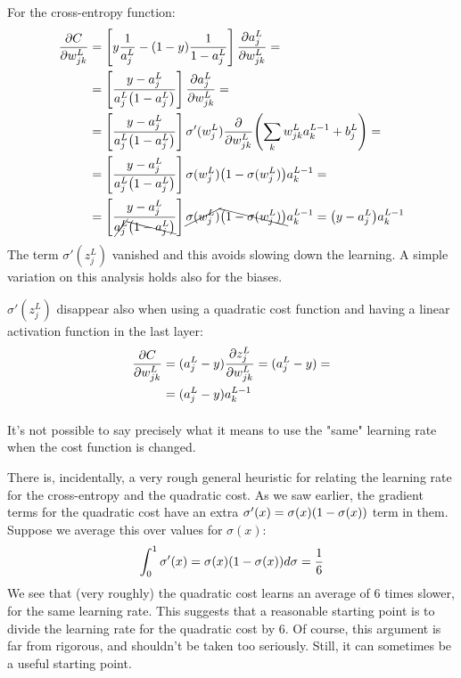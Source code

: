 For the cross-entropy function:
\begin{equation}
\begin{aligned}
\frac{\pr C}{\pr w_{jk}^L} &= \left[y \frac{1}{a_{j}^L} - \br{1-y}\frac{1}{1-a_{j}^L}\right]\frac{\pr a_j^L}{\pr w_{jk}^L} =\\
&=\left[\frac{y-a_{j}^L}{a_{j}^L\br{1-a_{j}^L}}\right]\frac{\pr a_j^L}{\pr w_{jk}^L} =\\
&=\left[\frac{y-a_{j}^L}{a_{j}^L\br{1-a_{j}^L}}\right] \sigma'(w_j^L)  \frac{\pr }{\pr w_{jk}^L} \br{\sum_k w_{jk}^L a_k^{L-1}+b_j^L}=\\
&=\left[\frac{y-a_{j}^L}{a_{j}^L\br{1-a_{j}^L}}\right] \sigma(w_j^L)\br{1-  \sigma(w_j^L)} a_k^{L-1}=\\
&=\left[\frac{y-a_{j}^L}{\cancel{a_{j}^L}\bcancel{{\br{1-a_{j}^L}}}}\right] \cancel{\sigma(w_j^L)}\bcancel{{\br{1-  \sigma(w_j^L)}}} a_k^{L-1}= \br{y-a_{j}^L} a_k^{L-1}
\end{aligned}
\end{equation}
The term $\sigma'(z_j^L)$ vanished and this avoids slowing down the learning. A simple variation on this analysis holds also for the biases.

$\sigma'(z_j^L)$ disappear also when using a quadratic cost function and having a linear activation function in the last layer:
\begin{equation}
\begin{aligned}
\frac{\mathrm{\partial} C}{\mathrm{\partial} w_{jk}^L} &= (a_{j}^L-y) \frac{\mathrm{\partial} z_{j}^L}{\mathrm{\partial} w_{jk}^L}  =(a_{j}^L-y) =
\\&= (a_{j}^L-y) a_k^{L-1}
\end{aligned}
\end{equation}

\paragraph{} It's not possible to say precisely what it means to use the "same" learning rate when the cost function is changed. 

There is, incidentally, a very rough general heuristic for relating the learning rate for the cross-entropy and the quadratic cost. As we saw earlier, the gradient terms for the quadratic cost have an extra $\sigma'(x) = \sigma(x) \br{1-\sigma(x)}$ term in them. Suppose we average this over values for $\sigma(x)$:
\begin{equation}
\int_0^1 \sigma'(x) = \sigma(x) \br{1-\sigma(x)} d\sigma = \frac{1}{6}
\end{equation}
We see that (very roughly) the quadratic cost learns an average of $6$ times slower, for the same learning rate. This suggests that a reasonable starting point is to divide the learning rate for the quadratic cost by $6$. Of course, this argument is far from rigorous, and shouldn't be taken too seriously. Still, it can sometimes be a useful starting point.

